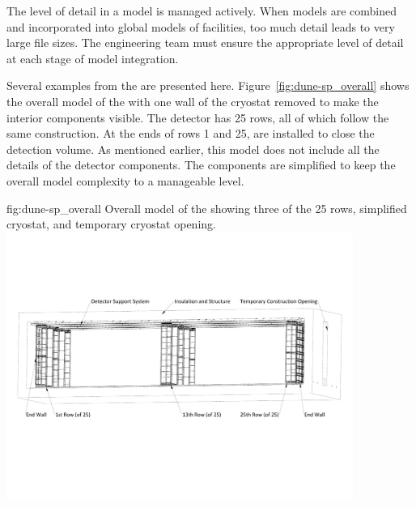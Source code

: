 The level of detail in a model is managed actively. When models are
combined and incorporated into global models of facilities, too much
detail leads to very large file sizes.  The  
engineering team must ensure the appropriate level of detail at each
stage of model integration.


Several examples from the  are presented
here. Figure~\ref{fig:dune-sp_overall} shows the overall model of the
 with one wall of the cryostat removed to make the
interior components visible. The detector has 25 rows, all of which
follow the same construction. At the ends of rows 1 and 25,
 are installed to close the detection volume.  As mentioned
earlier, this model does not include all the details of the detector
components. The components are simplified to keep the overall model
complexity to a manageable level.
\begin{dunefigure}{fig:dune-sp_overall}
  {Overall model of the  showing three of the 25 rows,
    simplified cryostat,  and temporary cryostat opening.}
  \includegraphics[width=0.85\textwidth]{graphics/Overall_model_SP}
\end{dunefigure} 


